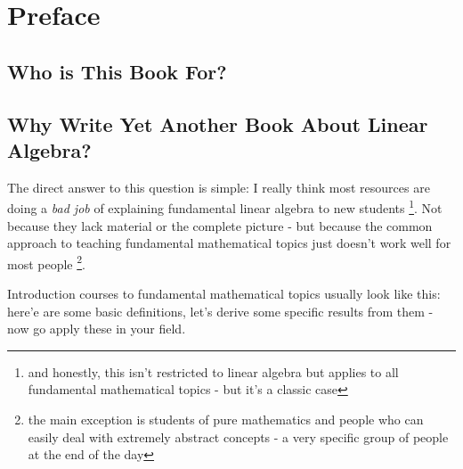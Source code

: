 \chapter*{Preface}

\section*{Who is This Book For?}
\lipsum[3-3]

\section*{Why Write Yet Another Book About Linear Algebra?}
The direct answer to this question is simple: I really think most resources are doing a \textit{bad job} of explaining fundamental linear algebra to new students \footnote{and honestly, this isn't restricted to linear algebra but applies to all fundamental mathematical topics - but it's a classic case}. Not because they lack material or the complete picture  - but because the common approach to teaching fundamental mathematical topics just doesn't work well for most people \footnote{the main exception is students of pure mathematics and people who can easily deal with extremely abstract concepts - a very specific group of people at the end of the day}.

Introduction courses to fundamental mathematical topics usually look like this: here'e are some basic definitions, let's derive some specific results from them - now go apply these in your field.
